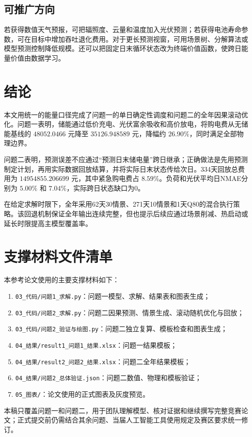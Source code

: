 \documentclass[UTF8,12pt,a4paper]{ctexart}
\begin{document}
\subsection{可推广方向}

若获得数值天气预报，可把辐照度、云量和温度加入光伏预测；若获得电池寿命参数，可在目标中增加吞吐退化费用。对于更长预测视窗，可用场景树、分解算法或模型预测控制降低规模。还可以把固定日末循环状态改为终端价值函数，使跨日能量价值由数据学习。

\section{结论}

本文用统一的能量口径完成了问题一的单日确定性调度和问题二的全年因果滚动优化。问题一表明，储能通过低价充电、光伏富余吸收和高价放电，将购电费从无储能基线的 $48052.0466$ 元降至 $35126.948589$ 元，降幅约 $26.90\%$，同时满足全部物理边界。

问题二表明，预测误差不应通过“预测日末储电量”跨日继承；正确做法是先用预测制定计划，再用实际数据回放结算，并将实际日末状态传给次日。334天回放总费用为 $14954855.206699$ 元，其中紧急购电费占 $8.59\%$。负荷和光伏平均日NMAE分别为 $5.00\%$ 和 $7.04\%$，实际跨日状态缺口为0。

在给定求解时限下，全年采用62天30情景、271天10情景和1天Q80的混合执行策略。该回退机制保证全年输出连续完整，但也提示后续应通过场景削减、热启动或延长时限提高主模型覆盖率。




\appendix
\section{支撑材料文件清单}

本参考论文使用的主要支撑材料如下：
\begin{enumerate}
  \item \texttt{03\_代码/问题1\_求解.py}：问题一模型、求解、结果表和图表生成；
  \item \texttt{03\_代码/问题2\_求解.py}：问题二因果预测、情景生成、滚动随机优化与回放；
  \item \texttt{03\_代码/问题2\_验证与绘图.py}：问题二独立复算、模板检查和图表生成；
  \item \texttt{04\_结果/result1\_问题1\_结果.xlsx}：问题一结果模板；
  \item \texttt{04\_结果/result2\_问题2\_结果.xlsx}：问题二全年结果模板；
  \item \texttt{04\_结果/问题2\_总体验证.json}：问题二数值、物理和模板验证；
  \item \texttt{05\_图表/}：论文使用的正式图表及灰度预览。
\end{enumerate}

本稿只覆盖问题一和问题二，用于团队理解模型、核对证据和继续撰写完整竞赛论文；正式提交前仍需结合其余问题、当届人工智能工具使用规定及赛区要求统一修订。
\end{document}
